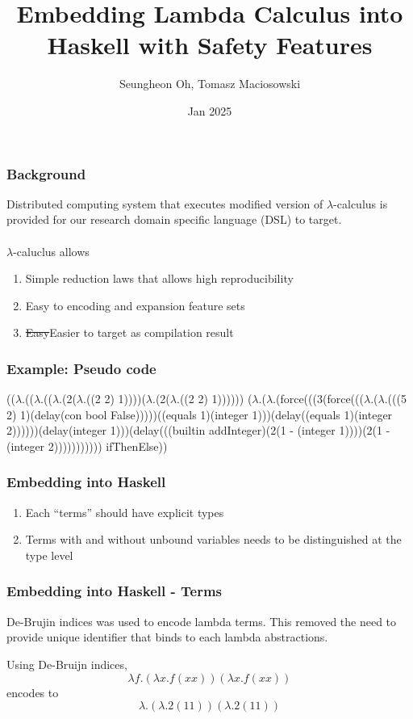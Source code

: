 \documentclass{beamer}
\title{Embedding Lambda Calculus into Haskell with Safety Features}
\author{Seungheon Oh, Tomasz Maciosowski}
\institute{MLabs}
\date{Jan 2025}
\begin{document}
\frame{\titlepage}

\begin{frame}
  \frametitle{Background}
  Distributed computing system that executes modified version of $\lambda$-calculus is provided for our research domain specific language (DSL) to target. \\~\\

  $\lambda$-caluclus allows
  \begin{enumerate}
  \item
    Simple reduction laws that allows high reproducibility
  \item
    Easy to encoding and expansion feature sets
  \item
    \sout{Easy}Easier to target as compilation result
  \end{enumerate}

\end{frame}

\begin{frame}[fragile]
  \frametitle{Example: Pseudo code}
  (($\lambda .$(($\lambda .$(($\lambda .$(2($\lambda .$((2 2) 1))))($\lambda .$(2($\lambda .$((2 2) 1))))))
  ($\lambda .$($\lambda .$(force(((3(force((($\lambda .$($\lambda .$(((5 2) 1)(delay(con bool False)))))((equals 1)(integer 1)))(delay((equals 1)(integer 2))))))(delay(integer 1)))(delay(((builtin addInteger)(2(1 - (integer 1))))(2(1 - (integer 2))))))))))) ifThenElse))
\end{frame}

\begin{frame}
  \frametitle{Embedding into Haskell}
  \begin{enumerate}
  \item
    Each ``terms'' should have explicit types
  \item
    Terms with and without unbound variables needs to be distinguished at the type level
  \end{enumerate}
\end{frame}

\begin{frame}
  \frametitle{Embedding into Haskell - Terms}

  De-Brujin indices was used to encode lambda terms. This removed the need to provide unique identifier that binds to each lambda abstractions.

  Using De-Bruijn indices,
  $$\lambda f. (\lambda x. f (x x)) (\lambda x. f (x x))$$
  encodes to
  $$\lambda. (\lambda. 2 (1 1)) (\lambda. 2 (1 1))$$
\end{frame}
\end{document}
